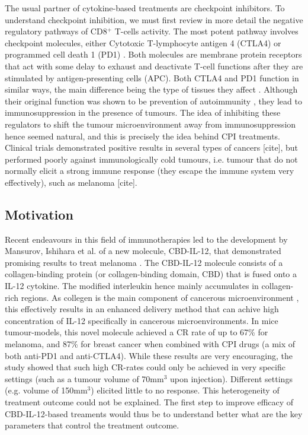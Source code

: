 \documentclass[11pt]{article}
\begin{document}
The usual partner of cytokine-based treatments are checkpoint inhibitors. To understand checkpoint inhibition, we must first review in more detail the negative regulatory pathways of CD8$^+$ T-cells activity. The most potent pathway involves checkpoint molecules, either Cytotoxic T-lymphocyte antigen 4 (CTLA4) or programmed cell death 1 (PD1) \cite{cpiProof}. Both molecules are membrane protein receptors that act with some delay to exhaust and deactivate T-cell functions after they are stimulated by antigen-presenting cells (APC). Both CTLA4 and PD1 function in similar ways, the main difference being the type of tissues they affect \cite{PDvsCTLA}. Although their original function was shown to be prevention of autoimmunity \cite{PD1Autoimmune}, they lead to immunosuppression in the presence of tumours. The idea of inhibiting these regulators to shift the tumour microenvironment away from immunosuppression hence seemed natural, and this is precisely the idea behind CPI treatments. Clinical trials demonstrated positive results in several types of cancers [cite], but performed poorly against immunologically cold tumours, i.e. tumour that do not normally elicit a strong immune response (they escape the immune system very effectively), such as melanoma [cite].

\subsection{Motivation}
\par Recent endeavours in this field of immunotherapies led to the development by Mansurov, Ishihara et al. of a new molecule, CBD-IL-12, that demonstrated promising results to treat melanoma \cite{cbdil12}. The CBD-IL-12  molecule consists of a collagen-binding protein (or collagen-binding domain, CBD) that is fused onto a IL-12 cytokine. The modified interleukin hence mainly accumulates in collagen-rich regions. As collegen is the main component of cancerous microenvironment \cite{collagenInCancer}, this effectively results in an enhanced delivery method that can achive high concentration of IL-12 specifically in cancerous microenvironments. In mice tumour-models, this novel molecule achieved a CR rate of up to 67\% for melanoma, and 87\% for breast cancer when combined with CPI drugs (a mix of both anti-PD1 and anti-CTLA4). While these results are very encouraging, the study showed that such high CR-rates could only be achieved in very specific settings (such as a tumour volume of 70mm$^3$ upon injection). Different settings (e.g. volume of 150mm$^3$) elicited little to no response. This heterogeneity of treatment outcome could not be explained. The first step to improve efficacy of CBD-IL-12-based treaments would thus be to understand better what are the key parameters that control the treatment outcome. 
\end{document}
